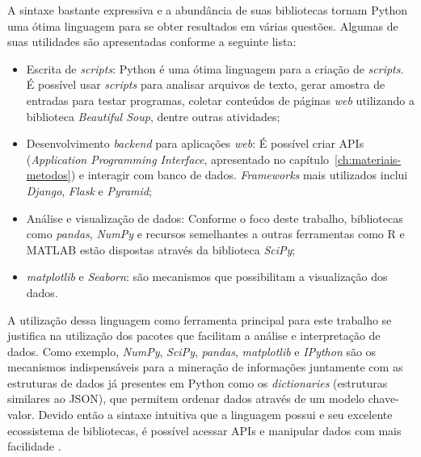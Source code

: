 A sintaxe bastante expressiva e a abundância de suas bibliotecas tornam Python uma ótima linguagem para se obter resultados em várias questões. Algumas de suas utilidades são apresentadas conforme a seguinte lista:

\begin{itemize}
	\item Escrita de \textit{scripts}: Python é uma ótima linguagem para a criação de \textit{scripts}. É possível usar \textit{scripts} para analisar arquivos de texto, gerar amostra de entradas para testar programas, coletar conteúdos de páginas \textit{web} utilizando a biblioteca \textit{Beautiful Soup}, dentre outras atividades;
	\item Desenvolvimento \textit{backend} para aplicações \textit{web}: É possível criar APIs (\textit{Application Programming Interface}, apresentado no capítulo~\ref{ch:materiais-metodos}) e interagir com banco de dados. \textit{Frameworks} mais utilizados inclui \textit{Django}, \textit{Flask} e \textit{Pyramid};
	\item Análise e visualização de dados: Conforme o foco deste trabalho, bibliotecas como \textit{pandas}, \textit{NumPy} e recursos semelhantes a outras ferramentas como R e MATLAB estão dispostas através da biblioteca \textit{SciPy};
	\item \textit{matplotlib} e \textit{Seaborn}: são mecanismos que possibilitam a visualização dos dados.
\end{itemize}

A utilização dessa linguagem como ferramenta principal para este trabalho se justifica na utilização dos pacotes que facilitam a análise e interpretação de dados. Como exemplo, \textit{NumPy}, \textit{SciPy}, \textit{pandas}, \textit{matplotlib} e \textit{IPython} são os mecanismos indispensáveis para a mineração de informações juntamente com as estruturas de dados já presentes em Python como os \textit{dictionaries} (estruturas similares ao JSON), que permitem ordenar dados através de um modelo chave-valor. Devido então a sintaxe intuitiva que a linguagem possui e seu excelente ecossistema de bibliotecas, é possível acessar APIs e manipular dados com mais facilidade \cite{mining-social-web}.













